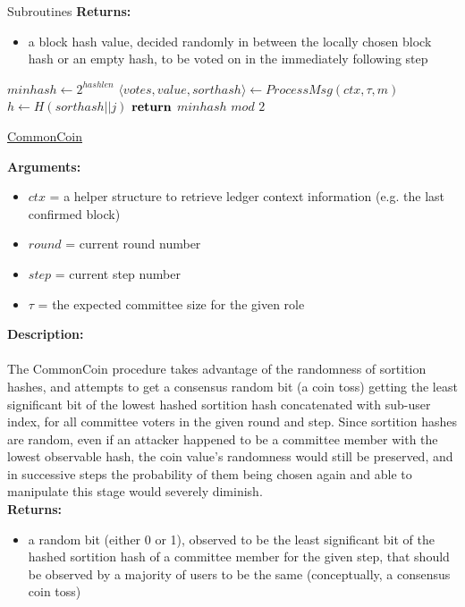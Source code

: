 \documentclass[10pt,a4paper]{article}
\begin{document}
\begin{section}{Subroutines}
\noindent \textbf{Returns:}
\begin{itemize}
    \item a block hash value, decided randomly in between the locally chosen block hash or an empty hash, to be voted on
    in the immediately following step
  \end{itemize}


\begin{algorithm}[H]
    \begin{algorithmic}[H]

    \State $minhash \gets 2^{hashlen}$
        \State $\langle votes,value,sorthash\rangle \gets ProcessMsg(ctx,\tau,m)$
                \State $h \gets H(sorthash||j)$
        \EndFor
    \EndFor
    $\Return$ $minhash$ $mod$ $2$
    \EndFunction
    \end{algorithmic}
    \caption{\underline{CommonCoin}}
\end{algorithm}


\noindent \textbf{Arguments:}
\begin{itemize}
    \item $ctx$ = a helper structure to retrieve ledger context information (e.g. the last confirmed block)
    \item $round$ = current round number
    \item $step$ = current step number
    \item $\tau$ = the expected committee size for the given role
  \end{itemize}

\noindent \textbf{Description:}\\\\
The CommonCoin procedure takes advantage of the randomness of sortition hashes, and attempts to
get a consensus random bit (a coin toss) getting the least significant bit of the lowest hashed
sortition hash concatenated with sub-user index, for all committee voters in the given round and step.
Since sortition hashes are random, even if an attacker happened to be a committee member with the lowest observable hash,
the coin value's randomness would still be preserved, and in successive steps the probability of them being chosen again and
able to manipulate this stage would severely diminish.\\

\noindent \textbf{Returns:}
\begin{itemize}
    \item a random bit (either 0 or 1), observed to be the least significant bit of the hashed sortition hash of a committee member for the given step,
    that should be observed by a majority of users to be the same (conceptually, a consensus coin toss)
  \end{itemize}

\end{section}
\end{document}
